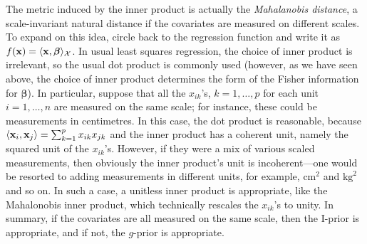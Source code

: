 The metric induced by the inner product is actually the \emph{Mahalanobis distance}, a scale-invariant natural distance if the covariates are measured on different scales.
To expand on this idea, circle back to the regression function and write it as $f({\mathbf x}) = \langle{\mathbf x},\boldsymbol\beta\rangle_{\mathcal X}$.
In usual least squares regression, the choice of inner product is irrelevant, so the usual dot product is commonly used (however, as we have seen above, the choice of inner product determines the form of the Fisher information for $\boldsymbol{\beta}$).
In particular, suppose that all the $x_{ik}$'s, $k=1,\dots,p$ for each unit $i=1,\dots,n$ are measured on the same scale; for instance, these could be measurements in centimetres.
In this case, the dot product is reasonable, because $\langle{\mathbf x}_i,{\mathbf x}_j\rangle = \sum_{k=1}^p x_{ik}x_{jk}$ and the inner product has a coherent unit, namely the squared unit of the $x_{ik}$'s.
However, if they were a mix of various scaled measurements, then obviously the inner product's unit is incoherent---one would be resorted to adding measurements in different units, for example, $\text{cm}^2$ and $\text{kg}^2$ and so on.
In such a case, a unitless inner product is appropriate, like the Mahalonobis inner product, which technically rescales the $x_{ik}$'s to unity.
In summary, if the covariates are all measured on the same scale, then the I-prior is appropriate, and if not, the $g$-prior is appropriate.
